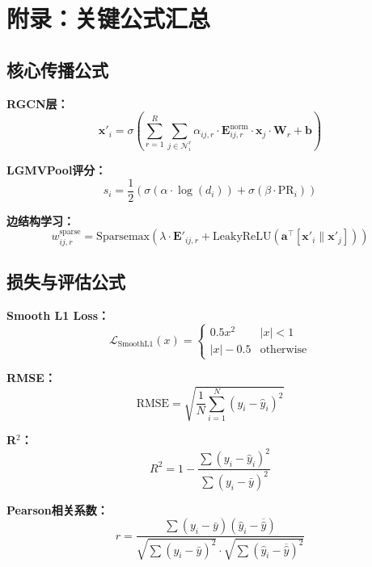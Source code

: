 \documentclass[UTF8, a4paper, 12pt]{article}
\begin{document}
\section{附录：关键公式汇总}

\subsection{核心传播公式}

\textbf{RGCN层：}
\begin{equation}
\mathbf{x}'_i = \sigma\left( \sum_{r=1}^{R} \sum_{j \in \mathcal{N}_i^r} \alpha_{ij,r} \cdot \mathbf{E}_{ij,r}^{\text{norm}} \cdot \mathbf{x}_j \cdot \mathbf{W}_r + \mathbf{b} \right)
\end{equation}

\textbf{LGMVPool评分：}
\begin{equation}
s_i = \frac{1}{2} \left( \sigma(\alpha \cdot \log(d_i)) + \sigma(\beta \cdot \text{PR}_i) \right)
\end{equation}

\textbf{边结构学习：}
\begin{equation}
w_{ij,r}^{\text{sparse}} = \text{Sparsemax}\left( \lambda \cdot \mathbf{E}'_{ij,r} + \text{LeakyReLU}(\mathbf{a}^{\top}[\mathbf{x}'_i \parallel \mathbf{x}'_j]) \right)
\end{equation}

\subsection{损失与评估公式}

\textbf{Smooth L1 Loss：}
\begin{equation}
\mathcal{L}_{\text{SmoothL1}}(x) = \begin{cases} 0.5 x^2 & |x| < 1 \\ |x| - 0.5 & \text{otherwise} \end{cases}
\end{equation}

\textbf{RMSE：}
\begin{equation}
\text{RMSE} = \sqrt{ \frac{1}{N} \sum_{i=1}^{N} (y_i - \hat{y}_i)^2 }
\end{equation}

\textbf{R$^2$：}
\begin{equation}
R^2 = 1 - \frac{\sum (y_i - \hat{y}_i)^2}{\sum (y_i - \bar{y})^2}
\end{equation}

\textbf{Pearson相关系数：}
\begin{equation}
r = \frac{\sum (y_i - \bar{y})(\hat{y}_i - \overline{\hat{y}})}{\sqrt{\sum (y_i - \bar{y})^2} \cdot \sqrt{\sum (\hat{y}_i - \overline{\hat{y}})^2}}
\end{equation}
\end{document}
